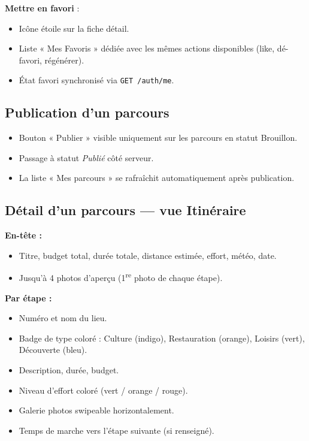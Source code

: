 \documentclass[11pt,a4paper]{article}
\begin{document}
\textbf{Mettre en favori} :
\begin{itemize}
  \item Icône étoile sur la fiche détail.
  \item Liste « Mes Favoris  » dédiée avec les mêmes actions disponibles
    (like, dé-favori, régénérer).
  \item État favori synchronisé via \texttt{GET /auth/me}.
\end{itemize}

\subsection{Publication d'un parcours}

\begin{itemize}
  \item Bouton « Publier  » visible uniquement sur les parcours en statut Brouillon.
  \item Passage à statut \textit{Publié} côté serveur.
  \item La liste « Mes parcours  » se rafraîchit automatiquement après publication.
\end{itemize}

\subsection{Détail d'un parcours --- vue Itinéraire}

\textbf{En-tête :}
\begin{itemize}
  \item Titre, budget total, durée totale, distance estimée, effort, météo, date.
  \item Jusqu'à 4 photos d'aperçu (1\textsuperscript{re} photo de chaque étape).
\end{itemize}

\textbf{Par étape :}
\begin{itemize}
  \item Numéro et nom du lieu.
  \item Badge de type coloré : Culture (indigo), Restauration (orange),
    Loisirs (vert), Découverte (bleu).
  \item Description, durée, budget.
  \item Niveau d'effort coloré (vert / orange / rouge).
  \item Galerie photos swipeable horizontalement.
  \item Temps de marche vers l'étape suivante (si renseigné).
\end{itemize}
\end{document}
